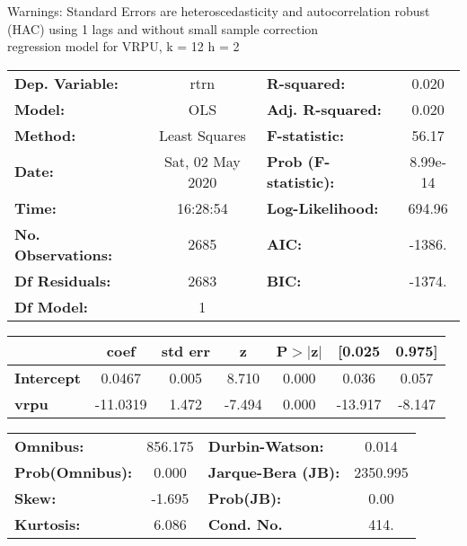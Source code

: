 Warnings: \newline
 [1] Standard Errors are heteroscedasticity and autocorrelation robust (HAC) using 1 lags and without small sample correction\\ 

regression model for VRPU, k = 12 h = 2\begin{center}
\begin{tabular}{lclc}
\toprule
\textbf{Dep. Variable:}    &       rtrn       & \textbf{  R-squared:         } &     0.020   \\
\textbf{Model:}            &       OLS        & \textbf{  Adj. R-squared:    } &     0.020   \\
\textbf{Method:}           &  Least Squares   & \textbf{  F-statistic:       } &     56.17   \\
\textbf{Date:}             & Sat, 02 May 2020 & \textbf{  Prob (F-statistic):} &  8.99e-14   \\
\textbf{Time:}             &     16:28:54     & \textbf{  Log-Likelihood:    } &    694.96   \\
\textbf{No. Observations:} &        2685      & \textbf{  AIC:               } &    -1386.   \\
\textbf{Df Residuals:}     &        2683      & \textbf{  BIC:               } &    -1374.   \\
\textbf{Df Model:}         &           1      & \textbf{                     } &             \\
\bottomrule
\end{tabular}
\begin{tabular}{lcccccc}
                   & \textbf{coef} & \textbf{std err} & \textbf{z} & \textbf{P$> |$z$|$} & \textbf{[0.025} & \textbf{0.975]}  \\
\midrule
\textbf{Intercept} &       0.0467  &        0.005     &     8.710  &         0.000        &        0.036    &        0.057     \\
\textbf{vrpu}      &     -11.0319  &        1.472     &    -7.494  &         0.000        &      -13.917    &       -8.147     \\
\bottomrule
\end{tabular}
\begin{tabular}{lclc}
\textbf{Omnibus:}       & 856.175 & \textbf{  Durbin-Watson:     } &    0.014  \\
\textbf{Prob(Omnibus):} &   0.000 & \textbf{  Jarque-Bera (JB):  } & 2350.995  \\
\textbf{Skew:}          &  -1.695 & \textbf{  Prob(JB):          } &     0.00  \\
\textbf{Kurtosis:}      &   6.086 & \textbf{  Cond. No.          } &     414.  \\
\bottomrule
\end{tabular}
\end{center}

